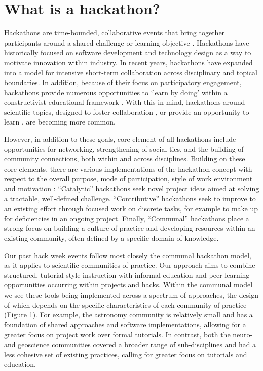 \section*{What is a hackathon?}

Hackathons are time-bounded, collaborative events that bring together participants around a shared challenge or learning objective \cite{Decker2015}.
Hackathons have historically focused on software development and technology design as a way to motivate innovation within industry.
In recent years, hackathons have expanded into a model for intensive short-term collaboration across disciplinary and topical boundaries.
In addition, because of their focus on participatory engagement, hackathons provide numerous opportunities to `learn by doing' within a constructivist educational framework \cite{Bransford2000-lu,Papert1980-fh}.
With this in mind, hackathons around scientific topics, designed to foster collaboration \cite{Groen2015-cj,Moller2013-ah}, or provide an opportunity to learn \cite{Kienzler2015-zu,Lamers2014-xf}, are becoming more common.

However, in addition to these goals, core element of all hackathons include opportunities for networking, strengthening of social ties, and the building of community connections, both within and across disciplines.
Building on these core elements, there are various implementations of the hackathon concept with respect to the overall purpose, mode of participation, style of work environment and motivation \cite{Drouhard2017}:
``Catalytic'' hackathons seek novel project ideas aimed at solving a tractable, well-defined challenge.
``Contributive'' hackathons seek to improve to an existing effort through focused work on discrete tasks, for example to make up for deficiencies in an ongoing project.
Finally, ``Communal'' hackathons place a strong focus on building a culture of practice and developing resources within an existing community, often defined by a specific domain of knowledge.

Our past hack week events follow most closely the communal hackathon model, as it applies to scientific communities of practice.
Our approach aims to combine structured, tutorial-style instruction with informal education and peer learning opportunities occurring within projects and hacks.
Within the communal model we see these tools being implemented across a spectrum of approaches, the design of which depends on the specific characteristics of each community of practice (Figure 1).
For example, the astronomy community is relatively small and has a foundation of shared approaches and software implementations, allowing for a greater focus on project work over formal tutorials.
In contrast, both the neuro- and geoscience communities covered a broader range of sub-disciplines and had a less cohesive set of existing practices, calling for greater focus on tutorials and education.

